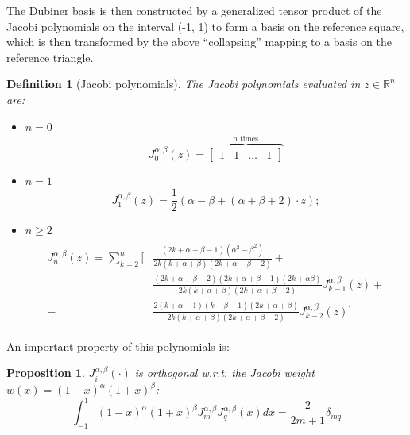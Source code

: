 \documentclass[a4paper,12pt]{article}
\newtheorem{definition}{Definition}
\newtheorem{prop}{Proposition}
\begin{document}
    The Dubiner basis is then constructed by a generalized tensor product of the Jacobi polynomials on the interval (-1, 1) to form a basis on the reference square, which is then transformed by the above “collapsing” mapping to a basis on the reference triangle.
    \begin{definition}[Jacobi polynomials]
    The Jacobi polynomials evaluated in $z\in \mathbb{R}^n$ are:
    \begin{itemize}[label=\textendash]
    \item $n=0$
    \begin{equation}
    J_0^{\alpha,\beta}(z)=\overbrace{\begin{bmatrix} 1 & 1 &\dots &1 \end{bmatrix}}^{\text{n times}}
    \end{equation}
    \item $n=1$
    \begin{equation}
    J_1^{\alpha,\beta}(z)=\frac{1}{2}(\alpha-\beta+(\alpha+\beta+2)\cdot z);
    \end{equation}
    \item $n\ge2$
    \newline
    \begin{equation}
    \begin{gathered}
    \begin{aligned}
    J_n^{\alpha,\beta}(z)=\sum_{k=2}^{n} \Big[&\frac{(2k+\alpha+\beta-1)(\alpha^{2}-\beta^{2})}{2k(k+\alpha+\beta)(2k+\alpha+\beta-2)}+ \\ &\frac{(2k+\alpha+\beta-2)(2k+\alpha+\beta-1)(2k+\alpha \beta)}{2k(k+\alpha+\beta)(2k+\alpha+\beta-2)} J_{k-1}^{\alpha,\beta}(z) +
    \\-&\frac{2(k+\alpha-1)(k+\beta-1)(2k+\alpha+\beta)}{2k(k+\alpha+\beta)(2k+\alpha+\beta-2)} J_{k-2}^{\alpha,\beta}(z) \Big]
    \end{aligned}
    \end{gathered}
    \end{equation}
    \end{itemize}
    \end{definition}
    
    An important property of this polynomials is:
    \begin{prop}\label{jac}
    $J_i^{\alpha,\beta}(\cdot)$ is orthogonal w.r.t. the Jacobi weight $w(x)=(1-x)^\alpha(1+x)^\beta$:
    \begin{equation}
    \int_{-1}^{1}{(1-x)^\alpha(1+x)^\beta J_m^{\alpha,\beta} J_q^{\alpha,\beta}(x)dx}=\frac{2}{2m+1} \delta_{mq} 
    \end{equation}
    \end{prop}
    
\end{document}
